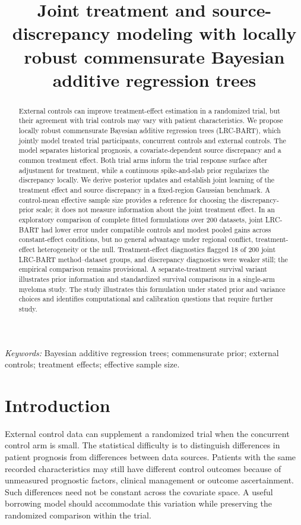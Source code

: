 \documentclass[11pt]{article}
\title{Joint treatment and source-discrepancy modeling with locally robust commensurate Bayesian additive regression trees}
\author{}
\date{}
\begin{document}
\maketitle
\begin{abstract}
External controls can improve treatment-effect estimation in a randomized trial, but their agreement with trial controls may vary with patient characteristics. We propose locally robust commensurate Bayesian additive regression trees (LRC-BART), which jointly model treated trial participants, concurrent controls and external controls. The model separates historical prognosis, a covariate-dependent source discrepancy and a common treatment effect. Both trial arms inform the trial response surface after adjustment for treatment, while a continuous spike-and-slab prior regularizes the discrepancy locally. We derive posterior updates and establish joint learning of the treatment effect and source discrepancy in a fixed-region Gaussian benchmark. A control-mean effective sample size provides a reference for choosing the discrepancy-prior scale; it does not measure information about the joint treatment effect. In an exploratory comparison of complete fitted formulations over 200 datasets, joint LRC-BART had lower error under compatible controls and modest pooled gains across constant-effect conditions, but no general advantage under regional conflict, treatment-effect heterogeneity or the null. Treatment-effect diagnostics flagged 18 of 200 joint LRC-BART method--dataset groups, and discrepancy diagnostics were weaker still; the empirical comparison remains provisional. A separate-treatment survival variant illustrates prior information and standardized survival comparisons in a single-arm myeloma study. The study illustrates this formulation under stated prior and variance choices and identifies computational and calibration questions that require further study.
\end{abstract}
\noindent\textit{Keywords:} Bayesian additive regression trees; commensurate prior; external controls; treatment effects; effective sample size.

\section{Introduction}
External control data can supplement a randomized trial when the concurrent control arm is small. The statistical difficulty is to distinguish differences in patient prognosis from differences between data sources. Patients with the same recorded characteristics may still have different control outcomes because of unmeasured prognostic factors, clinical management or outcome ascertainment. Such differences need not be constant across the covariate space. A useful borrowing model should accommodate this variation while preserving the randomized comparison within the trial.
\end{document}
